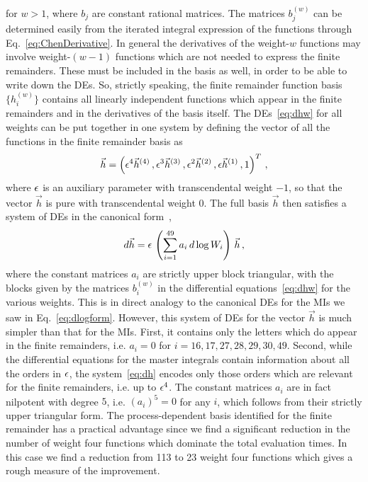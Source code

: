 \documentclass[main.tex]{subfiles}
\begin{document}
for $w>1$, where $b_j$ are constant rational matrices. The matrices $b_j^{(w)}$ can be determined easily from the iterated integral expression of the functions through Eq.~\eqref{eq:ChenDerivative}. 
In general the derivatives of the weight-$w$ functions may involve weight-$(w-1)$ functions which are not needed to express the finite remainders. These must be included in the basis as well, in order to be able to write down the DEs. So, strictly speaking, the finite remainder function basis $\{h^{(w)}_i\}$ contains all linearly independent functions which appear in the finite remainders and in the derivatives of the basis itself.
The DEs~\eqref{eq:dhw} for all weights can be put together in one system by defining the vector of all the functions in the finite remainder basis as
\begin{align}
\vec{h} = \left( \epsilon^4 \vec{h}^{(4)}\,, \epsilon^3 \vec{h}^{(3)}\,, \epsilon^2 \vec{h}^{(2)} \,, \epsilon \vec{h}^{(1)} \,, 1 \right)^T \,,
\end{align}
where $\epsilon$ is an auxiliary parameter with transcendental weight $-1$, so that the vector $\vec{h}$ is pure with transcendental weight $0$. The full basis $\vec{h}$ then satisfies a system of DEs in the canonical form~\cite{Henn:2013pwa},
\begin{align} \label{eq:dh}
d \vec{h} = \epsilon \, \left(  \sum_{i=1}^{49} a_i \, d\log W_i \right) \, \vec{h} \,,
\end{align}
where the constant matrices $a_i$ are strictly upper block triangular, with the blocks given by the matrices $b_i^{(w)}$ in the differential equations~\eqref{eq:dhw} for the various weights. This is in direct analogy to the canonical DEs for the MIs we saw in Eq.~\ref{eq:dlogform}.
However, this system of DEs for the vector $\vec{h}$ is much simpler than that for the MIs. First, it contains only the letters which do appear in the finite remainders, i.e. $a_i = 0$ for $i=16,17,27,28,29,30,49$. Second, while the differential equations for the master integrals contain information about all the orders in $\epsilon$, the system~\eqref{eq:dh} encodes only those orders which are relevant for the finite remainders, i.e. up to $\epsilon^4$. The constant matrices $a_i$ are in fact nilpotent with degree $5$, i.e. $(a_i)^5 = 0$ for any $i$, which follows from their strictly upper triangular form. The process-dependent basis identified for the finite remainder has a practical advantage since we find a significant reduction in the number of weight four functions which dominate the total evaluation times. In this case we find a reduction from 113 to 23 weight four functions which gives a rough measure of the improvement.
\end{document}
